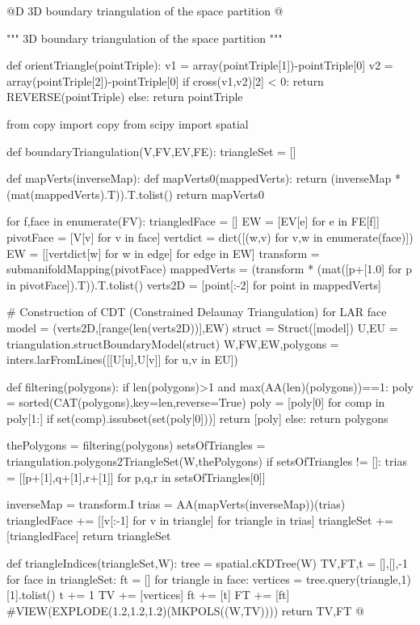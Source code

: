 \documentclass[11pt,oneside]{article}    %
\begin{document}
@D 3D boundary triangulation of the space partition 
@{""" 3D boundary triangulation of the space partition """

def orientTriangle(pointTriple):
    v1 = array(pointTriple[1])-pointTriple[0]
    v2 = array(pointTriple[2])-pointTriple[0]
    if cross(v1,v2)[2] < 0: return REVERSE(pointTriple)
    else: return pointTriple
    
from copy import copy
from scipy import spatial

def boundaryTriangulation(V,FV,EV,FE):
    triangleSet = []  
        
    def mapVerts(inverseMap):
        def mapVerts0(mappedVerts):
            return (inverseMap * (mat(mappedVerts).T)).T.tolist()
        return mapVerts0
        
    for f,face in enumerate(FV):
        triangledFace = []
        EW = [EV[e] for e in FE[f]]
        pivotFace = [V[v] for v in face]
        vertdict = dict([(w,v) for v,w in enumerate(face)])
        EW = [[vertdict[w] for w in edge] for edge in EW]
        transform = submanifoldMapping(pivotFace)
        mappedVerts = (transform * (mat([p+[1.0] for p in pivotFace]).T)).T.tolist()
        verts2D = [point[:-2] for point in mappedVerts] 
              
        # Construction of CDT (Constrained Delaunay Triangulation) for LAR face
        model = (verts2D,[range(len(verts2D))],EW)
        struct = Struct([model])
        U,EU = triangulation.structBoundaryModel(struct)
        W,FW,EW,polygons = inters.larFromLines([[U[u],U[v]] for u,v in EU])

        def filtering(polygons):
            if len(polygons)>1 and max(AA(len)(polygons))==1:
                poly = sorted(CAT(polygons),key=len,reverse=True)
                poly = [poly[0] for comp in poly[1:] if set(comp).issubset(set(poly[0]))]
                return [poly]
            else: return polygons

        thePolygons = filtering(polygons)
        setsOfTriangles = triangulation.polygons2TriangleSet(W,thePolygons)
        if setsOfTriangles != []:
            trias = [[p+[1],q+[1],r+[1]] for p,q,r in setsOfTriangles[0]]
            
            inverseMap = transform.I
            trias = AA(mapVerts(inverseMap))(trias)
            triangledFace += [[v[:-1] for v in triangle] for triangle in trias]
            triangleSet += [triangledFace]
    return triangleSet

def triangleIndices(triangleSet,W):
    tree = spatial.cKDTree(W)
    TV,FT,t = [],[],-1
    for face in triangleSet:
        ft = []
        for triangle in face:
            vertices = tree.query(triangle,1)[1].tolist()
            t += 1
            TV += [vertices]
            ft += [t]
        FT += [ft]
    #VIEW(EXPLODE(1.2,1.2,1.2)(MKPOLS((W,TV))))
    return TV,FT
@}
\end{document}
